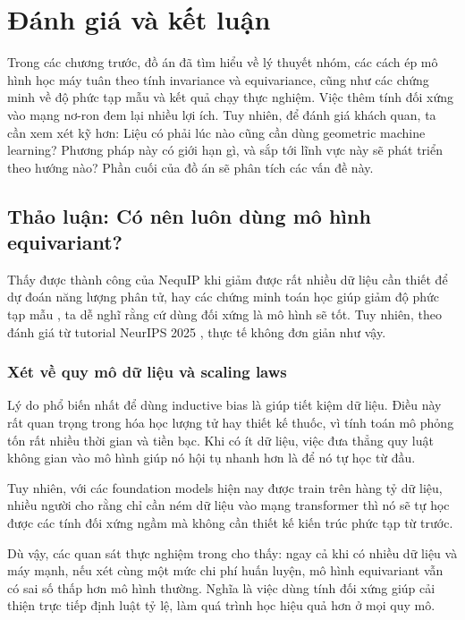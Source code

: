 \section{Đánh giá và kết luận}
\label{sec:danh-gia-ket-luan}

Trong các chương trước, đồ án đã tìm hiểu về lý thuyết nhóm, các cách ép mô hình học máy tuân theo tính invariance và equivariance, cũng như các chứng minh về độ phức tạp mẫu và kết quả chạy thực nghiệm. Việc thêm tính đối xứng vào mạng nơ-ron đem lại nhiều lợi ích. Tuy nhiên, để đánh giá khách quan, ta cần xem xét kỹ hơn: Liệu có phải lúc nào cũng cần dùng geometric machine learning? Phương pháp này có giới hạn gì, và sắp tới lĩnh vực này sẽ phát triển theo hướng nào? Phần cuối của đồ án sẽ phân tích các vấn đề này.

\subsection{Thảo luận: Có nên luôn dùng mô hình equivariant?}
\label{subsec:thao-luan}

Thấy được thành công của NequIP \cite{batzner2022nequip} khi giảm được rất nhiều dữ liệu cần thiết để dự đoán năng lượng phân tử, hay các chứng minh toán học giúp giảm độ phức tạp mẫu \cite{tahmasebi2023exact}, ta dễ nghĩ rằng cứ dùng đối xứng là mô hình sẽ tốt. Tuy nhiên, theo đánh giá từ tutorial NeurIPS 2025 \cite{jegelka2025tutorial}, thực tế không đơn giản như vậy.

\subsubsection{Xét về quy mô dữ liệu và scaling laws}

Lý do phổ biến nhất để dùng inductive bias là giúp tiết kiệm dữ liệu. Điều này rất quan trọng trong hóa học lượng tử hay thiết kế thuốc, vì tính toán mô phỏng tốn rất nhiều thời gian và tiền bạc. Khi có ít dữ liệu, việc đưa thẳng quy luật không gian vào mô hình giúp nó hội tụ nhanh hơn là để nó tự học từ đầu.

Tuy nhiên, với các foundation models hiện nay được train trên hàng tỷ dữ liệu, nhiều người cho rằng chỉ cần ném dữ liệu vào mạng transformer thì nó sẽ tự học được các tính đối xứng ngầm mà không cần thiết kế kiến trúc phức tạp từ trước. 

Dù vậy, các quan sát thực nghiệm trong \cite{jegelka2025tutorial} cho thấy: ngay cả khi có nhiều dữ liệu và máy mạnh, nếu xét cùng một mức chi phí huấn luyện, mô hình equivariant vẫn có sai số thấp hơn mô hình thường. Nghĩa là việc dùng tính đối xứng giúp cải thiện trực tiếp định luật tỷ lệ, làm quá trình học hiệu quả hơn ở mọi quy mô.

